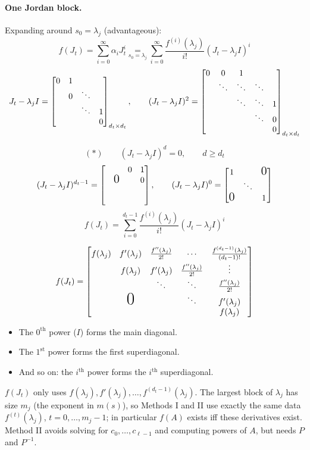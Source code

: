 \paragraph{One Jordan block.} Expanding around $s_0 = \lambda_j$ (advantageous):
\[
f(J_t) = \sum_{i=0}^{\infty}\alpha_iJ_t^i \underset{s_0 = \lambda_j}{=} \sum_{i=0}^{\infty}\frac{f^{(i)}(\lambda_j)}{i!}(J_t-\lambda_jI)^i
\]
\[
J_t - \lambda_jI = \begin{bmatrix}0 & 1 & & \\ & 0 & \ddots & \\ & & \ddots & 1\\ & & & 0\end{bmatrix}_{d_t\times d_t},
\qquad
(J_t-\lambda_jI)^2 = \begin{bmatrix}0 & 0 & 1 & & \\ & \ddots & \ddots & \ddots & \\ & & \ddots & \ddots & 1\\ & & & \ddots & 0\\ & & & & 0\end{bmatrix}_{d_t\times d_t}
\]

\[
(\ast)\qquad (J_t-\lambda_jI)^d = 0, \qquad d\geq d_t
\]
\[
(J_t-\lambda_jI)^{d_t-1} = \begin{bmatrix} & & 0 & 1\\ & \text{\Large 0} & & 0\\ & & & \\ & & & \end{bmatrix},
\qquad
(J_t-\lambda_jI)^0 = \begin{bmatrix}1 & & \text{\Large 0}\\ & \ddots & \\ \text{\Large 0} & & 1\end{bmatrix}
\]
\[
f(J_t) = \sum_{i=0}^{d_t-1}\frac{f^{(i)}(\lambda_j)}{i!}(J_t-\lambda_jI)^i
\]
\begin{keybox}
\[
f(J_t) = \bmat{
f(\lambda_j) & f'(\lambda_j) & \frac{f''(\lambda_j)}{2!} & \cdots & \frac{f^{(d_t-1)}(\lambda_j)}{(d_t-1)!}\\
 & f(\lambda_j) & f'(\lambda_j) & \frac{f''(\lambda_j)}{2!} & \vdots\\
 & & \ddots & \ddots & \frac{f''(\lambda_j)}{2!}\\
 & \text{\huge 0} & & \ddots & f'(\lambda_j)\\
 & & & & f(\lambda_j)}
\]
\end{keybox}
\begin{itemize}[nosep,topsep=0.4em]
\item The $0^{\text{th}}$ power ($I$) forms the main diagonal.
\item The $1^{\text{st}}$ power forms the first superdiagonal.
\item And so on: the $i^{\text{th}}$ power forms the $i^{\text{th}}$ superdiagonal.
\end{itemize}
\begin{insight}
$f(J_t)$ only uses $f(\lambda_j),f'(\lambda_j),\dots,f^{(d_t-1)}(\lambda_j)$. The largest block of $\lambda_j$ has size $m_j$ (the exponent in $m(s)$), so Methods I and II use exactly the same data $f^{(t)}(\lambda_j)$, $t=0,\dots,m_j-1$; in particular $f(A)$ exists iff these derivatives exist. Method II avoids solving for $c_0,\dots,c_{\ell-1}$ and computing powers of $A$, but needs $P$ and $P^{-1}$.
\end{insight}


